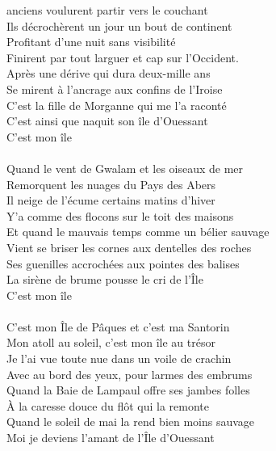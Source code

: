 
 anciens voulurent partir vers le couchant
\\Ils décrochèrent un jour un bout de continent
\\Profitant d’une nuit sans visibilité
\\Finirent par tout larguer et cap sur l’Occident.
\\Après une dérive qui dura deux-mille ans
\\Se mirent à l’ancrage aux confins de l’Iroise
\\C’est la fille de Morganne qui me l’a raconté
\\C’est ainsi que naquit son île d’Ouessant
\\C’est mon île \bissimple
\\\\Quand le vent de Gwalam et les oiseaux de mer
\\Remorquent les nuages du Pays des Abers
\\Il neige de l’écume certains matins d’hiver
\\Y’a comme des flocons sur le toit des maisons
\\Et quand le mauvais temps comme un bélier sauvage
\\Vient se briser les cornes aux dentelles des roches
\\Ses guenilles accrochées aux pointes des balises
\\La sirène de brume pousse le cri de l’Île
\\C’est mon île \bissimple
\\\\C’est mon Île de Pâques et c'est ma Santorin
\\Mon atoll au soleil, c’est mon île au trésor
\\Je l’ai vue toute nue dans un voile de crachin
\\Avec au bord des yeux, pour larmes des embrums
\\Quand la Baie de Lampaul offre ses jambes folles
\\À la caresse douce du flôt qui la remonte
\\Quand le soleil de mai la rend bien moins sauvage
\\Moi je deviens l’amant de l’Île d’Ouessant
